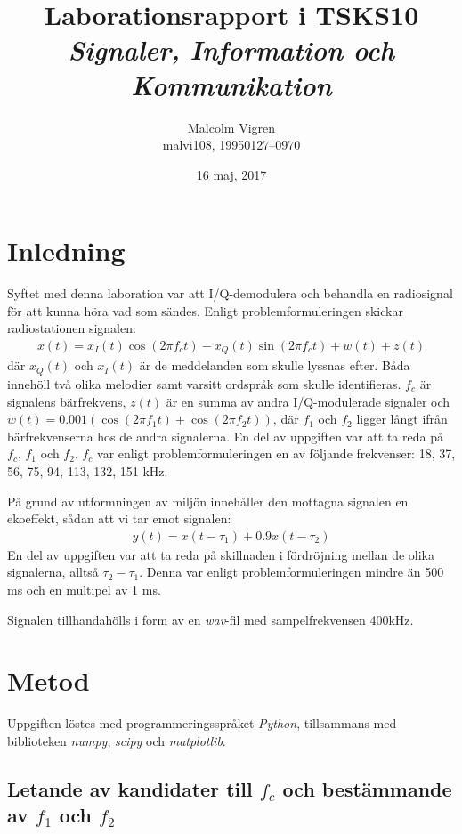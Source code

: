\documentclass[10pt,twocolumn]{article}
\title{Laborationsrapport i TSKS10 \emph{Signaler, Information och Kommunikation}}
\author{Malcolm Vigren \\ malvi108, 19950127--0970 }
\date{16 maj, 2017}
\begin{document}
\maketitle

\section{Inledning}

Syftet med denna laboration var att I/Q-demodulera och behandla en radiosignal
för att kunna höra vad som sändes. Enligt problemformuleringen skickar
radiostationen signalen:
\begin{align*}
    x(t) = x_I(t)\cos(2 \pi f_c t) - x_Q(t)\sin(2 \pi f_c t) + w(t) + z(t)
\end{align*}
där $x_Q(t)$ och $x_I(t)$ är de meddelanden som skulle lyssnas efter. 
Båda innehöll två olika melodier samt varsitt ordspråk som skulle identifieras.
$f_c$ är signalens bärfrekvens, $z(t)$ är en summa av andra I/Q-modulerade
signaler och $w(t) = 0.001(\cos(2 \pi f_1 t) + \cos(2 \pi f_2 t))$, där $f_1$ och
$f_2$ ligger långt ifrån bärfrekvenserna hos de andra signalerna. En del av
uppgiften var att ta reda på $f_c$, $f_1$ och $f_2$. $f_c$ var enligt
problemformuleringen en av följande frekvenser: 18, 37, 56, 75, 94, 113,
132, 151 kHz.

På grund av utformningen av miljön innehåller den mottagna signalen en
ekoeffekt, sådan att vi tar emot signalen:
\begin{align*}
    y(t) = x(t - \tau_1) + 0.9x(t - \tau_2)
\end{align*}
En del av uppgiften var att ta reda på skillnaden i fördröjning mellan 
de olika signalerna,
alltså $\tau_2 - \tau_1$. Denna var enligt problemformuleringen mindre än 500 ms
och en multipel av 1 ms.

Signalen tillhandahölls i form av en \textit{wav}-fil med sampelfrekvensen 400kHz.

\section{Metod}

Uppgiften löstes med programmeringsspråket \textit{Python}, tillsammans med
biblioteken \textit{numpy}, \textit{scipy} och \textit{matplotlib}.

\subsection{Letande av kandidater till $f_c$ och bestämmande av $f_1$ och
$f_2$}\label{sub:candidates}
\end{document}
